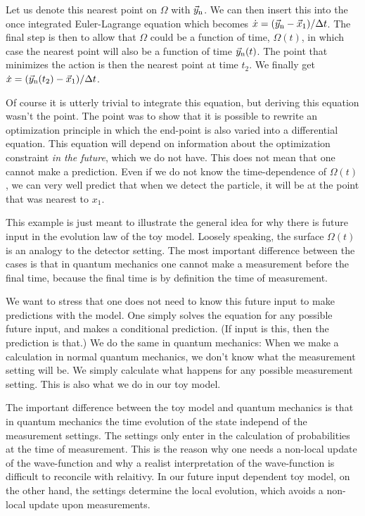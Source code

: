\documentclass[12pt]{article}
\begin{document}
Let us denote this nearest point on $\Omega$ with $\vec{y}_{\rm n}$. We can then insert this into the once integrated Euler-Lagrange equation which becomes $\dot{x} = (\vec{y}_{\rm n} -\vec{x}_1 )/\Delta t$. The final step is then to allow that $\Omega$ could be a function of time, $\Omega(t)$, in which case the nearest point will also be a function of time $\vec{y}_{\rm n}(t)$. The point that minimizes the action is then the nearest point at time $t_2$. We finally get $\dot{x} = (\vec{y}_{\rm n}(t_2) -\vec{x}_1 )/\Delta t$. 

Of course it is utterly trivial to integrate this equation, but deriving this equation wasn't the point. The point was to show that it is possible to rewrite an optimization principle in which the end-point is also varied into a differential equation. This equation will depend on information about the optimization constraint {\sl in the future}, which we do not have. This does not mean that one cannot make a prediction. Even if we do not know the time-dependence of 
$\Omega(t)$, we can very well predict that when we detect the particle, it will be at the point that was nearest to $x_1$. 

This example is just meant to illustrate the general idea for why there is future input in the evolution law of the toy model. Loosely speaking, the surface $\Omega(t)$ is an analogy to the detector setting. The most important difference between the cases is that in quantum mechanics one cannot make a measurement before the final time, because the final time is by definition the time of measurement. 

We want to stress that one does not need to know this future input to make predictions with the model. One simply solves the equation for any possible future input, and makes a conditional prediction. (If input is this, then the prediction is that.) We do the same in quantum mechanics: When we make a calculation in normal quantum mechanics, we don't know what the measurement setting will be. We simply calculate what happens for any possible measurement setting. This is also what we do in our toy model. 

The important difference between the toy model and quantum mechanics is that in quantum mechanics the time evolution of the state independ of the measurement settings. The settings only enter in the calculation of probabilities at the time of measurement. This is the reason why one needs a non-local update of the wave-function and why a realist interpretation of the wave-function is difficult to reconcile with relaitivy. In our future input dependent toy model, on the other hand, the settings determine the local evolution, which avoids a non-local update upon measurements. 
\end{document}
